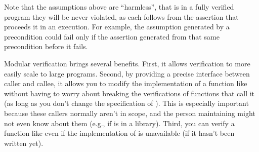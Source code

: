 Note that the assumptions above are ``harmless'', that is in a fully
verified program they will be never violated, as each follows
from the  assertion that proceeds it in an execution.
For example, the  assumption generated by a precondition could fail only if the 
assertion generated from that same precondition  before it fails.

\begin{note}
Modular verification brings several benefits. 
First, it allows verification to more easily scale to
large programs. Second, by providing a precise interface between
caller and callee, it allows you to modify the implementation of
a function like  without having to worry about breaking the
verifications of functions that call it (as long as you don't change
the specification of ). This is especially important
because these callers normally aren't in scope, and the person
maintaining  might not even know about them (e.g., if
 is in a library). Third, you can verify a function like
 even if the implementation of  is unavailable
(\eg if it hasn't been written yet). 
\end{note}

